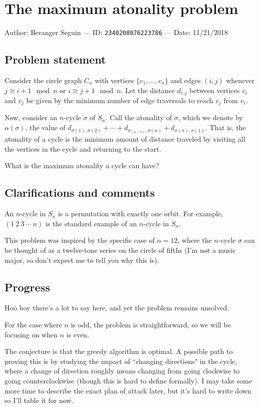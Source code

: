 
\section{The maximum atonality problem}

Author: Beranger Seguin --- ID: \verb`2340208076223786` --- Date: 11/21/2018

\subsection{Problem statement}

Consider the circle graph $C_n$ with vertices $\{v_1,\ldots,v_n\}$ and edges $(i,j)$ whenever $j\cong i+1\mod n$ or $i\cong j+1\mod n$. Let the distance $d_{i,j}$ between vertices $v_i$ and $v_j$ be given by the minimum number of edge traversals to reach $v_j$ from $v_i$.

Now, consider an $n$-cycle $\sigma$ of $S_n$. Call the atonality of $\sigma$, which we denote by $\alpha(\sigma)$, the value of $d_{\sigma(1),\sigma(2)}+\cdots+d_{\sigma_(n-1),\sigma(n)}+d_{\sigma(n),\sigma(1)}$. That is, the atonality of a cycle is the minimum amount of distance traveled by visiting all the vertices in the cycle and returning to the start.

What is the maximum atonality a cycle can have?

\subsection{Clarifications and comments}

An $n$-cycle in $S_n$ is a permutation with exactly one orbit. For example, $(1\ 2\ 3\  \cdots\ n)$ is the standard example of an $n$-cycle in $S_n$.

This problem was inspired by the specific case of $n=12$, where the $n$-cycle $\sigma$ can be thought of as a twelve-tone series on the circle of fifths (I'm not a music major, so don't expect me to tell you why this is).

\subsection{Progress}

Hoo boy there's a lot to say here, and yet the problem remains unsolved.

For the case where $n$ is odd, the problem is straightforward, so we will be focusing on when $n$ is even.

The conjecture is that the greedy algorithm is optimal. A possible path to proving this is by studying the impact of ``changing directions" in the cycle, where a change of direction roughly means changing from going clockwise to going counterclockwise (though this is hard to define formally). I may take some more time to describe the exact plan of attack later, but it's hard to write down so I'll table it for now.

